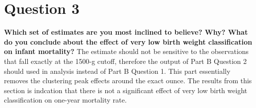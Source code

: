 \documentclass{article}
\begin{document}
\section*{Question 3}
\textbf{Which set of estimates are you most inclined to believe?  Why?  What do you conclude about the effect of very low birth weight classification on infant mortality?}
\newline \newline
The estimate should not be sensitive to the observations that fall exactly at the 1500-g cutoff, therefore the output of Part B Question 2 should used in analysis instead of Part B Question 1. This part essentially removes the clustering peak effects around the exact ounce. The results from this section is indcation that there is not a significant effect of very low birth weight classification on one-year mortality rate.
\end{document}
